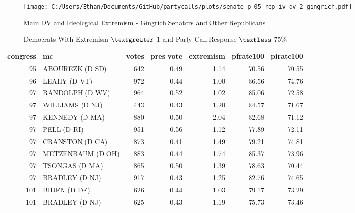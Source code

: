 \documentclass[12pt]{article}
\begin{document}
\begin{figure}[h]
	\caption{Main DV and Ideological Extremism - Gingrich Senators and Other Republicans}
	\texttt{[image: C:/Users/Ethan/Documents/GitHub/partycalls/plots/senate\_p\_05\_rep\_iv-dv\_2\_gingrich.pdf]}
 \end{figure}

\begin{table}[ht]
	\centering
		\caption{Democrats With Extremism $ \textgreater $ 1 and Party Call Response $ \textless $ 75\%}
	\begin{tabular}{rlrrrrr}
		\hline
		congress & mc & votes & pres vote & extremism & pfrate100 & pirate100 \\ 
		\hline
		95 & ABOUREZK (D SD) & 642 & 0.49 & 1.14 & 70.56 & 70.55 \\ 
		96 & LEAHY (D VT) & 972 & 0.44 & 1.00 & 86.56 & 74.76 \\ 
		97 & RANDOLPH (D WV) & 964 & 0.52 & 1.02 & 85.06 & 72.58 \\ 
		97 & WILLIAMS (D NJ) & 443 & 0.43 & 1.20 & 84.57 & 71.67 \\ 
		97 & KENNEDY (D MA) & 880 & 0.50 & 2.04 & 82.68 & 71.12 \\ 
		97 & PELL (D RI) & 951 & 0.56 & 1.12 & 77.89 & 72.11 \\ 
		97 & CRANSTON (D CA) & 873 & 0.41 & 1.49 & 79.21 & 74.81 \\ 
		97 & METZENBAUM (D OH) & 883 & 0.44 & 1.74 & 85.37 & 73.96 \\ 
		97 & TSONGAS (D MA) & 865 & 0.50 & 1.39 & 78.63 & 70.44 \\ 
		97 & BRADLEY (D NJ) & 917 & 0.43 & 1.25 & 82.76 & 74.65 \\ 
		101 & BIDEN (D DE) & 626 & 0.44 & 1.03 & 79.17 & 73.29 \\ 
		101 & BRADLEY (D NJ) & 625 & 0.43 & 1.19 & 75.73 & 73.46 \\ 
		\hline
	\end{tabular}
\end{table}
\end{document}
